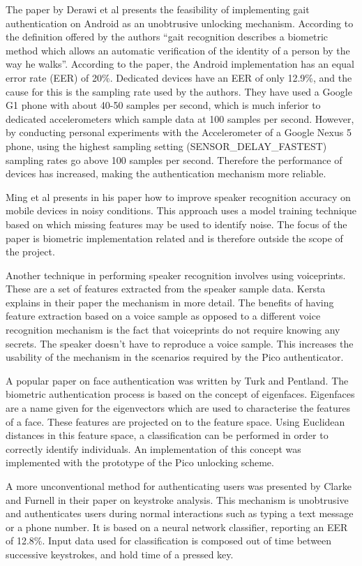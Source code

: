 The paper by Derawi et al \cite{derawi2010unobtrusive} presents the feasibility of implementing gait authentication on Android as an unobtrusive unlocking mechanism. According to the definition offered by the authors ``gait recognition describes a biometric method which allows an automatic verification of the identity of a person by the way he walks''. According to the paper, the Android implementation has an equal error rate (EER) of 20\%. Dedicated devices have an EER of only 12.9\%, and the cause for this is the sampling rate used by the authors. They have used a Google G1 phone with about 40-50 samples per second, which is much inferior to dedicated accelerometers which sample data at 100 samples per second. However, by conducting personal experiments with the Accelerometer of a Google Nexus 5 phone, using the highest sampling setting (SENSOR\_DELAY\_FASTEST) sampling rates go above 100 samples per second. Therefore the performance of devices has increased, making the authentication mechanism more reliable.

Ming et al presents in his paper \cite{ming2007robust} how to improve speaker recognition accuracy on mobile devices in noisy conditions. This approach uses a model training technique based on which missing features may be used to identify noise. The focus of the paper is biometric implementation related and is therefore outside the scope of the project. 

Another technique in performing speaker recognition involves using voiceprints. These are a set of features extracted from the speaker sample data. Kersta explains in their paper \cite{kersta2005voiceprint} the mechanism in more detail. The benefits of having feature extraction based on a voice sample as opposed to a different voice recognition mechanism is the fact that voiceprints do not require knowing any secrets. The speaker doesn't have to reproduce a voice sample. This increases the usability of the mechanism in the scenarios required by the Pico authenticator.

A popular paper on face authentication \cite{turk1991face} was written by Turk and Pentland. The biometric authentication process is based on the concept of eigenfaces. Eigenfaces are a name given for the eigenvectors which are used to characterise the features of a face. These features are projected on to the feature space. Using Euclidean distances in this feature space, a classification can be performed in order to correctly identify individuals. An implementation of this concept was implemented with the prototype of the Pico unlocking scheme.

A more unconventional method for authenticating users was presented by Clarke and Furnell in their paper \cite{clarke2007authenticating} on keystroke analysis. This mechanism is unobtrusive and authenticates users during normal interactions such as typing a text message or a phone number. It is based on a neural network classifier, reporting an EER of 12.8\%. Input data used for classification is composed out of time between successive keystrokes, and hold time of a pressed key. 






